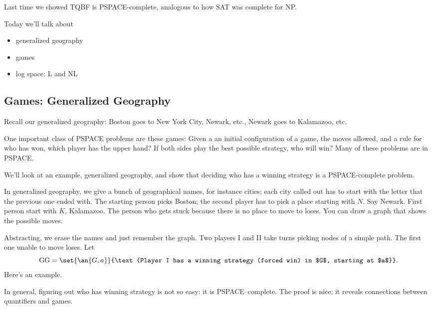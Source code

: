 


Last time we showed TQBF is PSPACE-complete, analogous to how SAT was complete for NP. %

Today we'll talk about
\begin{itemize}
\item
generalized geography
\item
games
\item
log space: L and NL
\end{itemize}

\subsection{Games: Generalized Geography}
Recall our generalized geography: Boston goes to New York City, Newark, etc., Newark goes to Kalamazoo, etc. 

One important class of PSPACE problems are these games: Given a an initial configuration of a game, the moves allowed, and a rule for who has won, which player has the upper hand? If both sides play the best possible strategy, who will win? Many of these problems are in PSPACE. %

We'll look at an example, generalized geography, and show that deciding who has a winning strategy is a PSPACE-complete problem. 

In generalized geography, we give a bunch of geographical names, for instance cities; each city called out has to start with the letter that the previous one ended with. The starting person picks Boston; the second player has to pick a place starting with $N$. Say Newark. First person start with $K$, Kalamazoo. The person who gets stuck because there is no place to move to loses.
You can draw a graph that shows the possible moves.


Abstracting, we erase the names and just remember the graph. 
Two players I and II take turns picking nodes of a simple path. The first one unable to move loses. Let
\[
\text{GG}=\set{\an{G,a}}{\text{Player I has a winning strategy (forced win) in $G$, starting at $a$}}.
\]
Here's an example.



In general, figuring out who has winning strategy is not so easy: it is PSPACE--complete. The proof is nice: it reveals connections between quantifiers and games.

